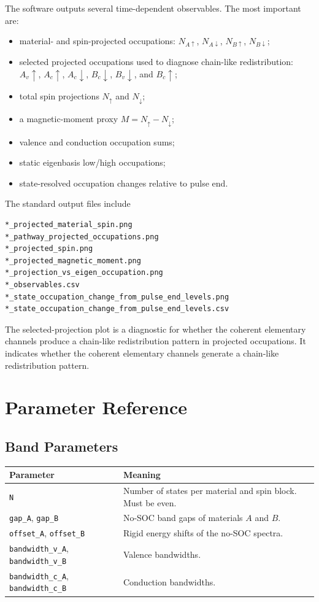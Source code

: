 \documentclass[11pt,a4paper]{article}
\begin{document}
The software outputs several time-dependent observables.  The most important are:
\begin{itemize}[leftmargin=2em]
  \item material- and spin-projected occupations: $N_{A\uparrow}$, $N_{A\downarrow}$, $N_{B\uparrow}$, $N_{B\downarrow}$;
  \item selected projected occupations used to diagnose chain-like redistribution: \(A_v\uparrow\), \(A_c\uparrow\), \(A_c\downarrow\), \(B_c\downarrow\), \(B_v\downarrow\), and \(B_c\uparrow\);
  \item total spin projections $N_\uparrow$ and $N_\downarrow$;
  \item a magnetic-moment proxy $M=N_\uparrow-N_\downarrow$;
  \item valence and conduction occupation sums;
  \item static eigenbasis low/high occupations;
  \item state-resolved occupation changes relative to pulse end.
\end{itemize}

The standard output files include
\begin{lstlisting}
*_projected_material_spin.png
*_pathway_projected_occupations.png
*_projected_spin.png
*_projected_magnetic_moment.png
*_projection_vs_eigen_occupation.png
*_observables.csv
*_state_occupation_change_from_pulse_end_levels.png
*_state_occupation_change_from_pulse_end_levels.csv
\end{lstlisting}
The selected-projection plot is a diagnostic for whether the coherent elementary 
channels produce a chain-like redistribution pattern in projected occupations.
It indicates whether the coherent elementary channels generate a chain-like 
redistribution pattern.


\section{Parameter Reference}

\subsection{Band Parameters}

\begin{longtable}{p{}p{}}
\toprule
Parameter & Meaning \\
\midrule
\texttt{N} & Number of states per material and spin block.  Must be even. \\
\texttt{gap\_A}, \texttt{gap\_B} & No-SOC band gaps of materials $A$ and $B$. \\
\texttt{offset\_A}, \texttt{offset\_B} & Rigid energy shifts of the no-SOC spectra. \\
\texttt{bandwidth\_v\_A}, \texttt{bandwidth\_v\_B} & Valence bandwidths. \\
\texttt{bandwidth\_c\_A}, \texttt{bandwidth\_c\_B} & Conduction bandwidths. \\
\bottomrule
\end{longtable}
\end{document}
